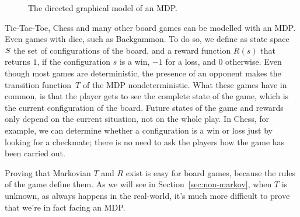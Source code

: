 \begin{figure}
	\centering
	\caption{The directed graphical model of an MDP.}
	\label{fig:mdp}
\end{figure}

\begin{example}
	\label{ex:board-games}
	Tic-Tac-Toe, Chess and many other board games can be modelled with an MDP.
	Even games with dice, such as Backgammon. To do so, we define as state
	space~$S$ the set of configurations of the board, and a reward
	function $R(s)$ that returns $1$, if the configuration $s$ is a win, $-1$
	for a loss, and 0 otherwise. Even though most games are deterministic, the
	presence of an opponent makes the transition function~$T$ of the MDP
	nondeterministic.  What these games have in common, is that the player gets
	to see the complete state of the game, which is the current configuration of
	the board. Future states of the game and rewards only depend on the current
	situation, not on the whole play. In Chess, for example, we can determine
	whether a configuration is a win or loss just by looking for a checkmate;
	there is no need to ask the players how the game has been carried out.

	Proving that Markovian $T$ and $R$ exist is easy for board games, because
	the rules of the game define them. As we will see in
	Section~\ref{sec:non-markov}, when $T$ is unknown, as always happens in the
	real-world, it's much more difficult to prove that we're in fact facing an
	MDP.
\end{example}


